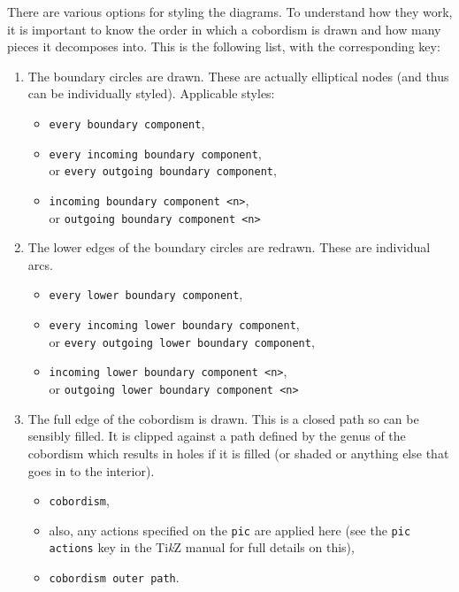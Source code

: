 \documentclass{ltxdoc}
\begin{document}
There are various options for styling the diagrams.
To understand how they work, it is important to know the order in which a cobordism is drawn and how many pieces it decomposes into.
This is the following list, with the corresponding key:

\begin{enumerate}
\item The boundary circles are drawn.
These are actually elliptical nodes (and thus can be individually styled).
Applicable styles:

\begin{itemize}
\item \Verb+every boundary component+,
\item \Verb+every incoming boundary component+,\\
or  \Verb+every outgoing boundary component+,
\item \Verb+incoming boundary component <n>+,\\
or \Verb+outgoing boundary component <n>+
\end{itemize}

\item The lower edges of the boundary circles are redrawn.
These are individual arcs.

\begin{itemize}
\item \Verb+every lower boundary component+,
\item \Verb+every incoming lower boundary component+,\\or  \Verb+every outgoing lower boundary component+,
\item \Verb+incoming lower boundary component <n>+,\\or \Verb+outgoing lower boundary component <n>+
\end{itemize}

\item The full edge of the cobordism is drawn.
This is a closed path so can be sensibly filled.
It is clipped against a path defined by the genus of the cobordism which results in holes if it is filled (or shaded or anything else that goes in to the interior).

\begin{itemize}
\item \Verb+cobordism+,
\item also, any actions specified on the \Verb+pic+ are applied here (see the \Verb+pic actions+ key in the Ti\emph{k}Z manual for full details on this),
\item \Verb+cobordism outer path+.
\end{itemize}


\end{enumerate}
\end{document}

